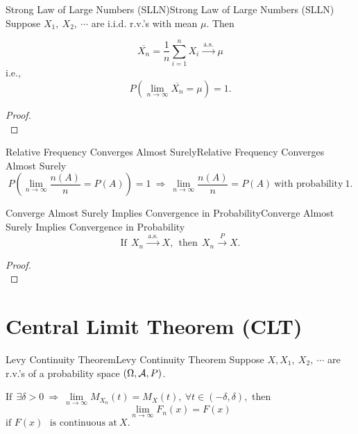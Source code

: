 \documentclass{elegantbook}
\begin{document}
\begin{theorem}{Strong Law of Large Numbers (SLLN)}{Strong Law of Large Numbers (SLLN)}
Suppose \(X_{1},\ X_{2},\ \cdots\) are i.i.d. r.v.'s with mean \(\mu\). Then

\[\overline{X_{n}} = \frac{1}{n}\sum_{i = 1}^{n}X_{i}\xrightarrow{\ \text{a.s.}\ }\mu\]
i.e.,
\[P\left( \lim_{n \rightarrow \infty}\overline{X_{n}} = \mu \right) = 1.\]
\end{theorem}

\begin{proof}
\\[4cm]\vspace{0.01cm}
\end{proof}

\begin{remark}{Relative Frequency Converges Almost Surely}{Relative Frequency Converges Almost Surely}
\[P\left( \lim_{n \rightarrow \infty}\frac{n( A )}{n} = P(A) \right) = 1\  \Rightarrow \ \lim_{n \rightarrow \infty}\frac{n( A )}{n} = P( A )\ \mathrm{\text{with\ probability}}\ 1.\]
\end{remark}

\begin{theorem}{Converge Almost Surely Implies Convergence in Probability}{Converge Almost Surely Implies Convergence in Probability}
\[\mathrm{\text{If}}\mathrm{\ }\ X_{n}\xrightarrow{\ \text{a.s.}\ }X,\mathrm{\ }\mathrm{\ }\mathrm{\text{then}}\mathrm{\ }\ X_{n}\xrightarrow{\ P\ }X.\]
\end{theorem}

\begin{proof}
\\[4cm]\vspace{0.01cm}
\end{proof}

\section{Central Limit Theorem (CLT)}

\begin{theorem}{Levy Continuity Theorem}{Levy Continuity Theorem}
Suppose \(X,X_{1},\ X_{2},\ \cdots\) are r.v.'s of a probability space $(\Omega,\mathcal{A}, P)$. 

\(\mathrm{\text{If}}\ \ \exists\delta > 0\  \Rightarrow \ \lim\limits_{n \rightarrow \infty}{M_{X_{n}}(t)} = M_{X}(t),\ \forall t \in \left( - \delta,\delta \right),\) \( \mathrm{\text{then}}\)\[ \lim_{n \rightarrow \infty}F_{n}(x) = F(x)\]
\(\mathrm{\text{if }}F(x)\text{\ }\mathrm{\text{is\ continuous\ at}}\ X.\)
\end{theorem}
\end{document}
